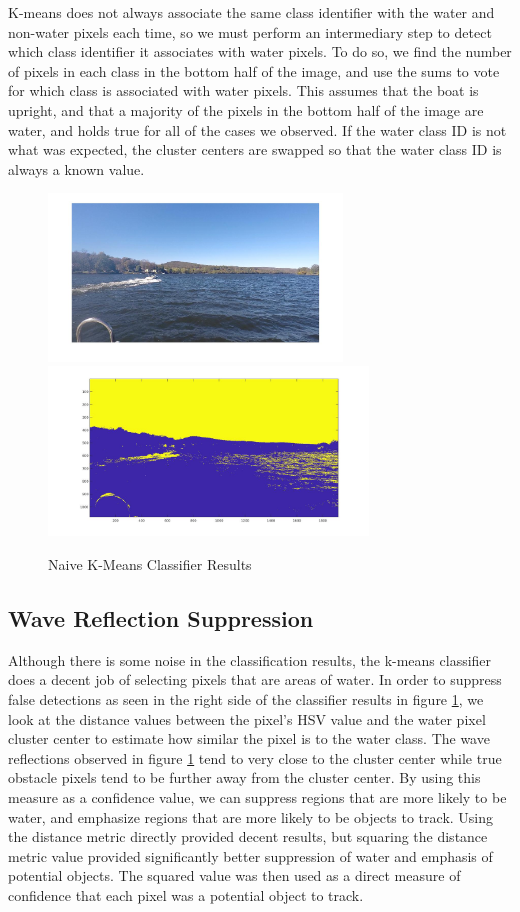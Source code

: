 \documentclass{article}
\begin{document}
K-means does not always associate the same class identifier with the water and
non-water pixels each time, so we must perform an intermediary step to detect
which class identifier it associates with water pixels.  To do so, we find the
number of pixels in each class in the bottom half of the image, and use the sums
to vote for which class is associated with water pixels. This assumes that the
boat is upright, and that a majority of the pixels in the bottom half of the
image are water, and holds true for all of the cases we observed.  If the water
class ID is not what was expected, the cluster centers are swapped so that the
water class ID is always a known value.

\begin{figure}
\includegraphics[width=7.8cm]{hsv_kmeans2_orig}
\includegraphics[width=8.5cm]{hsv_kmeans2_result}
\centering
\caption{Naive K-Means Classifier Results}
\label{fig:kmeans}
\end{figure}

\subsection{Wave Reflection Suppression}
Although there is some noise in the classification results, the k-means
classifier does a decent job of selecting pixels that are areas of water. In
order to suppress false detections as seen in the right side of the classifier
results in figure \ref{fig:kmeans}, we look at the distance values between the
pixel's HSV value and the water pixel cluster center to estimate how similar the
pixel is to the water class.  The wave reflections observed in figure
\ref{fig:kmeans} tend to very close to the cluster center while true obstacle
pixels tend to be further away from the cluster center.  By using this measure
as a confidence value, we can suppress regions that are more likely to be water,
and emphasize regions that are more likely to be objects to track.  Using the
distance metric directly provided decent results, but squaring the distance
metric value provided significantly better suppression of water and emphasis of
potential objects.  The squared value was then used as a direct measure of
confidence that each pixel was a potential object to track.
\end{document}
